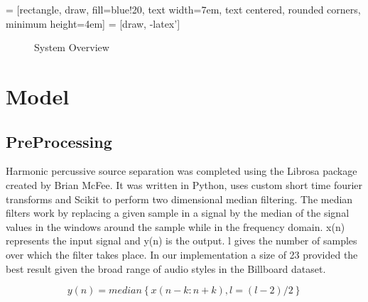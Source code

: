 \documentclass{article}
\begin{document}
 = [rectangle, draw, fill=blue!20,
    text width=7em, text centered, rounded corners, minimum height=4em]
 = [draw, -latex']

\begin{figure}
\caption{System Overview}
\label{fig:overview}
\end{figure}

\section{Model}

\subsection{PreProcessing}

Harmonic percussive source separation was completed using the Librosa package
created by Brian McFee. It was written in Python, uses custom short time
fourier transforms and Scikit to perform two dimensional median filtering. The
median filters work by replacing a given sample in a signal by the median of
the signal values in the windows around the sample \cite{FitzGerald:11} while
in the frequency domain. x(n) represents the input signal and y(n) is the
output. l gives the number of samples over which the filter takes place. In our
implementation a size of 23 provided the best result given the broad range of
audio styles in the Billboard dataset.

$$y(n) = median \left \{x(n-k:n+k),l = (l-2)/2  \right \}$$
\end{document}
